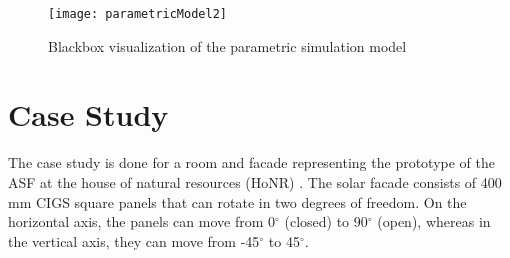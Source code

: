 			\begin{figure}[ht] %
				\begin{center}
				\texttt{[image: parametricModel2]}
				\caption{Blackbox visualization of the parametric simulation model}
				\label{fig:parametricModel}
				\end{center} 
			\end{figure}

	\section{Case Study}

		The case study is done for a room and facade representing the prototype of the ASF at the house of natural resources (HoNR) \cite{nagy2016}.  The solar facade consists of 400\,mm CIGS square panels that can rotate in two degrees of freedom. On the horizontal axis, the panels can move from 0$^{\circ}$ (closed) to 90$^{\circ}$ (open), whereas in the vertical axis, they can move from -45$^{\circ}$ to 45$^{\circ}$. %



